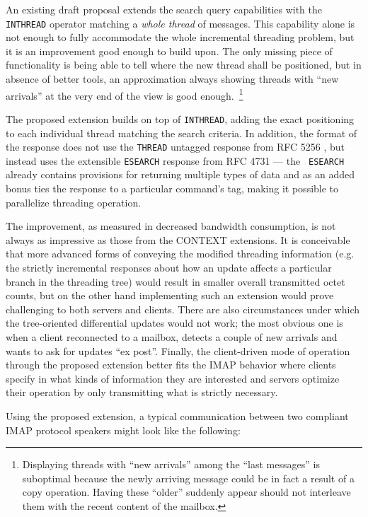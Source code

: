 \documentclass[trojita]{subfiles}
\begin{document}
An existing draft proposal \cite{draft-ietf-morg-inthread} extends the search query capabilities with the {\tt INTHREAD}
operator matching a {\em whole thread} of messages.  This capability alone is not enough to fully accommodate the whole
incremental threading problem, but it is an improvement good enough to build upon.  The only missing piece of
functionality is being able to tell where the new thread shall be positioned, but in absence of better tools, an
approximation always showing threads with ``new arrivals'' at the very end of the view is good
enough.~\footnote{Displaying threads with ``new arrivals'' among the ``last messages'' is suboptimal because the newly
arriving message could be in fact a result of a copy operation.  Having these ``older'' suddenly appear should not
interleave them with the recent content of the mailbox.}

The proposed extension builds on top of {\tt INTHREAD}, adding the exact positioning to each individual thread matching
the search criteria.  In addition, the format of the response does not use the {\tt THREAD} untagged response from RFC
5256 \cite{rfc5256}, but instead uses the extensible {\tt ESEARCH} response from RFC 4731 \cite{rfc4731} --- the {\tt
ESEARCH} already contains provisions for returning multiple types of data and as an added bonus ties the response to a
particular command's tag, making it possible to parallelize threading operation.

The improvement, as measured in decreased bandwidth consumption, is not always as impressive as those from the CONTEXT
extensions.  It is conceivable that more advanced forms of conveying the modified threading information (e.g. the
strictly incremental responses about how an update affects a particular branch in the threading tree) would result in
smaller overall transmitted octet counts, but on the other hand implementing such an extension would prove challenging
to both servers and clients.  There are also circumstances under which the tree-oriented differential updates would not
work; the most obvious one is when a client reconnected to a mailbox, detects a couple of new arrivals and wants to ask
for updates ``ex post''.  Finally, the client-driven mode of operation through the proposed extension better fits the
IMAP behavior where clients specify in what kinds of information they are interested and servers optimize their
operation by only transmitting what is strictly necessary.

Using the proposed extension, a typical communication between two compliant IMAP protocol speakers might look like the
following:
\end{document}
